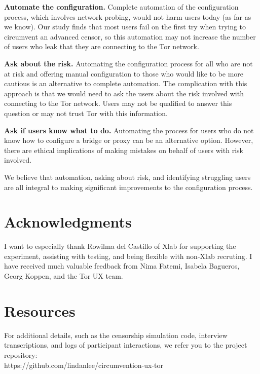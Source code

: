 \documentclass[USenglish,oneside,twocolumn]{article}
\begin{document}
\begin{description}
\item{\bfseries Automate the configuration.} Complete automation of the configuration process, which involves network probing, would not harm users today (as far as we know). Our study finds that most users fail on the first try when trying to circumvent an advanced censor, so this automation may not increase the number of users who leak that they are connecting to the Tor network. 
\item{\bfseries Ask about the risk.} Automating the configuration process for all who are not at risk and offering manual configuration to those who would like to be more cautious is an alternative to complete automation. The complication with this approach is that we would need to ask the users about the risk involved with connecting to the Tor network. Users may not be qualified to answer this question or may not trust Tor with this information. 
\item{\bfseries Ask if users know what to do.} Automating the process for users who do not know how to configure a bridge or proxy can be an alternative option. However, there are ethical implications of making mistakes on behalf of users with risk involved. 
\end{description}

We believe that automation, asking about risk, and identifying struggling users are all integral to making significant improvements to the configuration process. 

\section {Acknowledgments}
I want to especially thank Rowilma del Castillo of Xlab for supporting the experiment, assisting with testing, and being flexible with non-Xlab recruting. I have received much valuable feedback from Nima Fatemi, Isabela Bagueros, Georg Koppen, and the Tor UX team. 

\section {Resources} 
For additional details, such as the censorship simulation code, interview transcriptions, and logs of participant interactions, we refer you to the project repository: \\

\noindent https://github.com/lindanlee/circumvention-ux-tor
\end{document}
